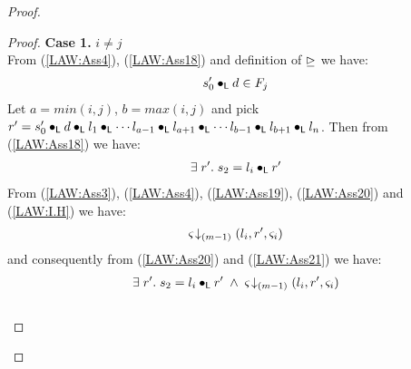 \begin{lemma}[]
\begin{proof}
\begin{proof}
\noindent\textbf{Case 1. }$i \not= j$\\
From (\ref{LAW:Ass4}), (\ref{LAW:Ass18}) and definition of $\unrhd$ we have:
%
\begin{align}
	s'_0 \bullet_{\textsf{L}} d \in F_j \label{LAW:Ass19}
\end{align}
Let $a = min(i, j)$, $b = max(i, j)$ and pick $r' = s'_0 \bullet_{\textsf{L}} d \bullet_{\textsf{L}} l_1 \bullet_{\textsf{L}} \cdots l_{a-1} \bullet_{\textsf{L}} l_{a+1} \bullet_{\textsf{L}} \cdots l_{b-1} \bullet_{\textsf{L}} l_{b+1} \bullet_{\textsf{L}} l_n$. Then from (\ref{LAW:Ass18}) we have:
%
\begin{align}
	\exists\; r'.\; s_2 = l_i \bullet_{\textsf{L}} r' \label{LAW:Ass20}
\end{align}
%
From (\ref{LAW:Ass3}), (\ref{LAW:Ass4}), (\ref{LAW:Ass19}), (\ref{LAW:Ass20}) and (\ref{LAW:I.H}) we have:
%
\begin{align}
	\varsigma_{} \!\downarrow_{(m-1)} \left(l_i, r', \varsigma_{i}\right) \label{LAW:Ass21}
\end{align}
and consequently from (\ref{LAW:Ass20}) and (\ref{LAW:Ass21}) we have:
%
\begin{align}
	\exists\; r'.\; s_2 = l_i \bullet_{\textsf{L}} r' \;\land\; \varsigma_{} \!\downarrow_{(m-1)} \left(l_i, r', \varsigma_{i}\right) \label{LAW:Ass22}
\end{align}\\


\end{proof}
\end{proof}
\end{lemma}
